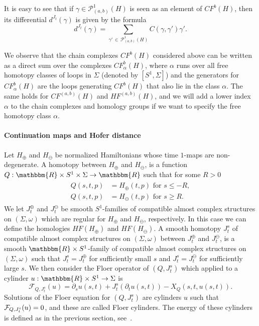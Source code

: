 \documentclass[AHL,Unicode,longabstracts,published]{cedram}
\newcommand{\R}{\mathbbm{R}}
\newcommand{\clP}{\mathcal{P}}
\newcommand{\clF}{\mathcal{F}}
\begin{document}
It is easy to see that if $\gamma \in \clP^1_{(a,b)}(H) $ is seen as an element of $CF^{b}(H)$, then its differential $d^{J_t} (\gamma) $ is given by the formula
\begin{equation*}
d^{J_t} (\gamma) = \sum_{\gamma'\,\in\, \clP^1_{(a,b)}(H)} C(\gamma,\gamma')\gamma'.
\end{equation*}

We observe that the chain complexes $CF^b(H)$ considered above can be written as a direct sum over the complexes $CF_{\alpha}^b(H)$, where $\alpha$ runs over all free homotopy classes of loops in $\Sigma$ (denoted by $[S^1,\Sigma]$) and the generators for $CF_{\alpha}^b(H)$ are the loops generating $CF^b(H)$ that also lie in the class $\alpha$. The same holds for $CF^{(a,b)}(H)$ and $HF^{(a,b)}(H)$, and we will add a lower index $\alpha$ to the chain complexes and homology groups if we want to specify the free homotopy class $\alpha$.



\paragraph{Continuation maps and Hofer distance} Let $H_\oplus$ and $H_\ominus$ be normalized Hamiltonians whose time $1$-maps are non-degenerate. A homotopy between $H_\oplus$ and $H_\ominus$, is a function $Q:\R \times S^1 \times \Sigma \to \R$ such that for some $R>0$
\begin{align}\label{eq:G properties}
\begin{split}
Q(s,t,p) &= H_\oplus(t,p) \text{ for } s\leq -R,
\\
Q(s,t,p) &= H_\ominus(t,p) \text{ for } s\geq R.
\end{split}
\end{align}
We let $J^\oplus_t$ and $J^\ominus_t$ be smooth $S^1$-families of compatible almost complex structures on $(\Sigma,\omega)$ which are regular for $H_\oplus$ and $H_\ominus$, respectively. In this case we can define the homologies $HF(H_\oplus)$ and $HF(H_\ominus)$. A smooth homotopy $J^s_t$ of compatible almost complex structures on $(\Sigma, \omega)$ between $J^\oplus_t$ and $J^\ominus_t$, is a smooth $\R \times S^1$-family of compatible almost complex structures on $(\Sigma, \omega)$ such that $J^s_t=J_t^\oplus$ for sufficiently small $s$ and $J^s_t=J_t^\ominus$ for sufficiently large $s$. We then consider the Floer operator of $(Q,J^s_t)$ which applied to a cylinder $u: \R \times S^1 \to \Sigma$ is
\begin{equation}
\clF_{Q,J^s_t}(u) = \partial_s u(s,t) + J^s_t(\partial_t u(s,t)) - X_Q(s,t,u(s,t)).
\end{equation}
Solutions of the Floer equation for $(Q,J^s_t)$ are cylinders $u$ such that  $\clF_{Q,J^s_t}(u) \linebreak=0$, and these are called Floer cylinders. The energy of these cylinders is defined as in the previous section, see~\cite{AD}.
\end{document}
